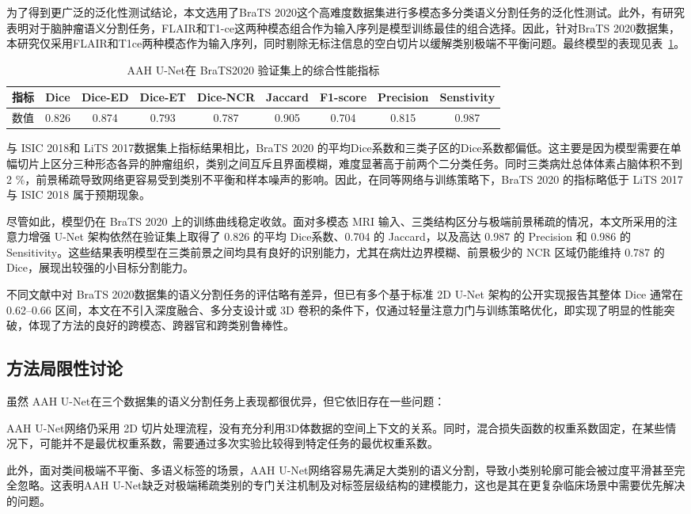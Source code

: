 为了得到更广泛的泛化性测试结论，本文选用了BraTS 2020这个高难度数据集进行多模态多分类语义分割任务的泛化性测试。此外，有研究表明对于脑肿瘤语义分割任务，FLAIR和T1-ce这两种模态组合作为输入序列是模型训练最佳的组合选择\cite{buchner2023}。因此，针对BraTS 2020数据集，本研究仅采用FLAIR和T1ce两种模态作为输入序列，同时剔除无标注信息的空白切片以缓解类别极端不平衡问题。最终模型的表现见表~\ref{tab:brain_final_metrics}。

\begin{table}[!h]
    \centering
    \caption{AAH U-Net在 BraTS2020 验证集上的综合性能指标}
    \label{tab:brain_final_metrics}
    \begin{tabular}{lcccccccc}
        \toprule
        指标 & Dice & Dice-ED & Dice-ET & Dice-NCR & Jaccard & F1-score & Precision & Senstivity\\
        \midrule
        数值 & 0.826 & 0.874 & 0.793 & 0.787 & 0.905 & 0.704 & 0.815 & 0.987 \\
        \bottomrule
    \end{tabular}
\end{table}

与 ISIC 2018和 LiTS 2017数据集上指标结果相比，BraTS 2020 的平均Dice系数和三类子区的Dice系数都偏低。这主要是因为模型需要在单幅切片上区分三种形态各异的肿瘤组织，类别之间互斥且界面模糊，难度显著高于前两个二分类任务。同时三类病灶总体体素占脑体积不到 2 \%，前景稀疏导致网络更容易受到类别不平衡和样本噪声的影响。因此，在同等网络与训练策略下，BraTS 2020 的指标略低于 LiTS 2017 与 ISIC 2018 属于预期现象。

尽管如此，模型仍在 BraTS 2020 上的训练曲线稳定收敛。面对多模态 MRI 输入、三类结构区分与极端前景稀疏的情况，本文所采用的注意力增强 U-Net 架构依然在验证集上取得了 0.826 的平均 Dice系数、0.704 的 Jaccard，以及高达 0.987 的 Precision 和 0.986 的 Sensitivity。这些结果表明模型在三类前景之间均具有良好的识别能力，尤其在病灶边界模糊、前景极少的 NCR 区域仍能维持 0.787 的 Dice，展现出较强的小目标分割能力。

不同文献中对 BraTS 2020数据集的语义分割任务的评估略有差异\cite{islam2020,wang2021,menze2015}，但已有多个基于标准 2D U-Net 架构的公开实现报告其整体 Dice 通常在 0.62–0.66 区间，本文在不引入深度融合、多分支设计或 3D 卷积的条件下，仅通过轻量注意力门与训练策略优化，即实现了明显的性能突破，体现了方法的良好的跨模态、跨器官和跨类别鲁棒性。

\subsection{方法局限性讨论}

虽然 AAH U-Net在三个数据集的语义分割任务上表现都很优异，但它依旧存在一些问题：

AAH U-Net网络仍采用 2D 切片处理流程，没有充分利用3D体数据的空间上下文的关系。同时，混合损失函数的权重系数固定，在某些情况下，可能并不是最优权重系数，需要通过多次实验比较得到特定任务的最优权重系数。

此外，面对类间极端不平衡、多语义标签的场景，AAH U-Net网络容易先满足大类别的语义分割，导致小类别轮廓可能会被过度平滑甚至完全忽略。这表明AAH U-Net缺乏对极端稀疏类别的专门关注机制及对标签层级结构的建模能力，这也是其在更复杂临床场景中需要优先解决的问题。
